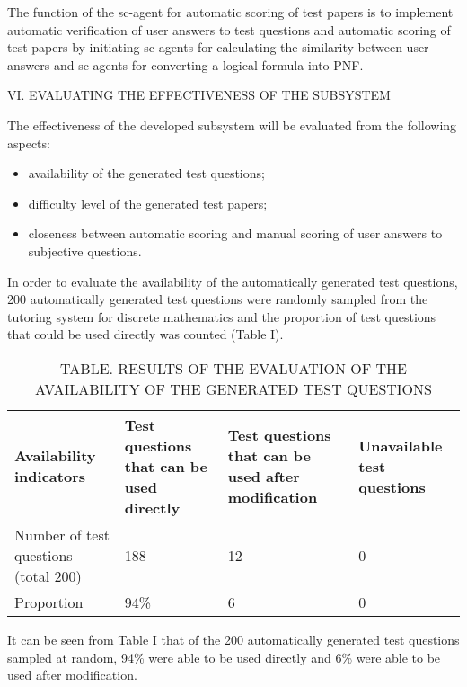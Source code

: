 \documentclass{article}
\begin{document}
\begin{multicols}{2}
The function of the sc-agent for automatic scoring of test papers is to implement automatic verification of user answers to test questions and automatic scoring of test papers by initiating sc-agents for calculating the similarity between user answers and sc-agents for converting a logical formula into PNF.

\begin{center}
VI. EVALUATING THE EFFECTIVENESS OF THE
SUBSYSTEM
\end{center}
\vspace{-0.3cm}
The effectiveness of the developed subsystem will be
evaluated from the following aspects:

\begin{itemize}
    \item availability of the generated test questions;
    \item difficulty level of the generated test papers;
    \item closeness between automatic scoring and manual scoring of user answers to subjective questions.
\end{itemize}

In order to evaluate the availability of the automatically generated test questions, 200 automatically generated test questions were randomly sampled from the tutoring system for discrete mathematics and the proportion of test questions that could be used directly was counted (Table I).

\vspace{-0.6cm}
\begin{table}[H]
\caption{\label{tab:canonsummary}TABLE. RESULTS OF THE EVALUATION OF THE AVAILABILITY OF THE GENERATED TEST QUESTIONS}
\begin{center}
\vspace{-0.3cm}
\begin{tabular}{|p{1.8cm}|p{2cm}|p{2cm}|p{1.6cm}|}
\hline
Availability indicators & Test questions that can be used directly & Test questions that 
can be used after modification & Unavailable test questions \\
\hline
Number of test questions (total 200) & 188 & 12 & 0 \\
\hline
Proportion & 94\% & 6 & 0\\
\hline
\end{tabular}
\end{center}
\end{table}

\vspace{-0.8cm}
It can be seen from Table I that of the 200 automatically generated test questions sampled at random, 94\% were able to be used directly and 6\% were able to be used after modification.


\end{multicols}
\end{document}
